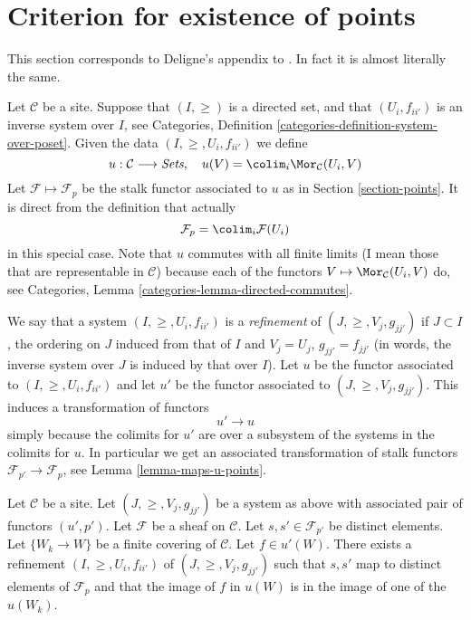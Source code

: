 \section{Criterion for existence of points}
\label{section-criterion-points}

\noindent
This section corresponds to Deligne's appendix to \cite[Expos\'e VI]{SGA4}.
In fact it is almost literally the same.

\medskip\noindent
Let $\mathcal{C}$ be a site.
Suppose that $(I, \geq)$ is a directed set,
and that $(U_i, f_{ii'})$ is an inverse system over $I$, see
Categories, Definition \ref{categories-definition-system-over-poset}.
Given the data $(I, \geq, U_i, f_{ii'})$ we define
$$
u : \mathcal{C} \longrightarrow \textit{Sets}, \quad
u(V) = \colim_i \Mor_\mathcal{C}(U_i , V)
$$
Let $\mathcal{F} \mapsto \mathcal{F}_p$ be the stalk functor
associated to $u$ as in Section \ref{section-points}.
It is direct from the definition that actually
$$
\mathcal{F}_p = \colim_i \mathcal{F}(U_i)
$$
in this special case.
Note that $u$ commutes with all finite limits (I mean those that
are representable in $\mathcal{C}$) because
each of the functors $V \mapsto \Mor_\mathcal{C}(U_i , V)$
do, see Categories, Lemma \ref{categories-lemma-directed-commutes}.

\medskip\noindent
We say that a system $(I, \geq, U_i, f_{ii'})$
is a {\it refinement} of $(J, \geq, V_j, g_{jj'})$ if
$J \subset I$, the ordering on $J$ induced from that of $I$
and $V_j = U_j$, $g_{jj'} = f_{jj'}$ (in words, the inverse system
over $J$ is induced by that over $I$). Let $u$ be the functor
associated to $(I, \geq, U_i, f_{ii'})$ and let $u'$ be the
functor associated to $(J, \geq, V_j, g_{jj'})$.
This induces a transformation of functors
$$
u' \longrightarrow u
$$
simply because the colimits for $u'$ are over a subsystem
of the systems in the colimits for $u$.
In particular we get an associated transformation of
stalk functors $\mathcal{F}_{p'} \to \mathcal{F}_p$,
see Lemma \ref{lemma-maps-u-points}.

\begin{lemma}
\label{lemma-refine}
Let $\mathcal{C}$ be a site.
Let $(J, \geq, V_j, g_{jj'})$ be a system as above with associated
pair of functors $(u', p')$.
Let $\mathcal{F}$ be a sheaf on $\mathcal{C}$.
Let $s, s' \in \mathcal{F}_{p'}$ be distinct elements.
Let $\{W_k \to W\}$ be a finite covering of $\mathcal{C}$.
Let $f \in u'(W)$.
There exists a refinement $(I, \geq, U_i, f_{ii'})$
of $(J, \geq, V_j, g_{jj'})$ such that $s, s'$ map
to distinct elements of $\mathcal{F}_p$ and that
the image of $f$ in $u(W)$ is in the image of one of
the $u(W_k)$.
\end{lemma}

